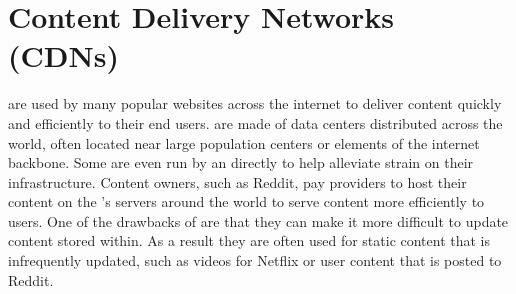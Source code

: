 \section{Content Delivery Networks (CDNs)}\label{sec:background_cdns}

\CDNs are used by many popular websites across the internet to deliver content quickly and efficiently to their end users. \CDNs are made of data centers distributed across the world, often located near large population centers or elements of the internet backbone. Some \cdns are even run by an \isp directly to help alleviate strain on their infrastructure. Content owners, such as Reddit, pay \cdn providers to host their content on the \cdn's servers around the world to serve content more efficiently to users. One of the drawbacks of \cdns are that they can make it more difficult to update content stored within. As a result they are often used for static content that is infrequently updated, such as videos for Netflix or user content that is posted to Reddit.